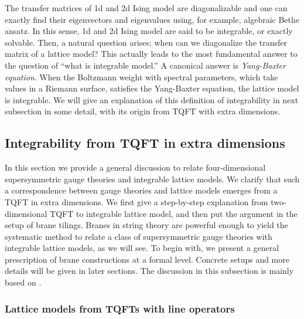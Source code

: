 The transfer matrices of 1d and 2d Ising model are diagonalizable
and one can exactly find their eigenvectors and eigenvalues using,
for example, algebraic Bethe ansatz. In this sense, 1d and 2d Ising
model are said to be integrable, or exactly solvable. Then, a natural
question arises; when can we diagonalize the transfer matrix of a
lattice model? This actually leads to the most fundamental answer
to the question of ``what is integrable model.'' A canonical answer
is \emph{Yang-Baxter equation}. When the Boltzmann weight with spectral
parameters, which take values in a Riemann surface, satisfies the
Yang-Baxter equation, the lattice model is integrable. We will give
an explanation of this definition of integrability in next subsection
in some detail, with its origin from TQFT with extra dimensions.






\subsection{Integrability from TQFT in extra dimensions}

In this section we provide a general discussion to relate four-dimensional
supersymmetric gauge theories and integrable lattice models. We clarify
that such a correspondence between gauge theories and lattice models
emerges from a TQFT in extra dimensions. We first give a step-by-step
explanation from two-dimensional TQFT to integrable lattice model,
and then put the argument in the setup of brane tilings. Branes in
string theory are powerful enough to yield the systematic method to
relate a class of supersymmetric gauge theories with integrable lattice
models, as we will see. To begin with, we present a general prescription
of brane constructions at a formal level. Concrete setups and more
details will be given in later sections.
The discussion in this subsection is mainly based on \cite{Yagi:2016oum}.

\subsubsection{Lattice models from TQFTs with line operators}

